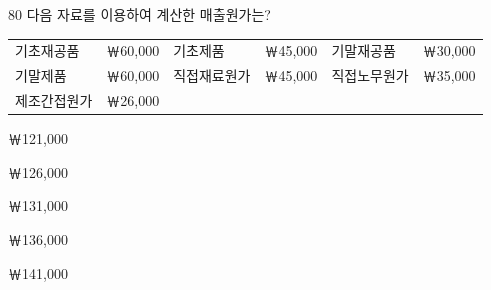 \begin{question}{80}
다음 자료를 이용하여 계산한 매출원가는?
\begin{framedtext}
\begin{tabular}{@{}llllll@{}}
기초재공품 & ￦60,000 & 기초제품 & ￦45,000 & 기말재공품 & ￦30,000 \\
기말제품 & ￦60,000 & 직접재료원가 & ￦45,000 & 직접노무원가 & ￦35,000 \\
제조간접원가 & ￦26,000 & & & & \\
\end{tabular}
\end{framedtext}
\begin{choices}
  \item ￦121,000
  \item ￦126,000
  \item ￦131,000
  \item ￦136,000
  \item ￦141,000
\end{choices}
\end{question}
